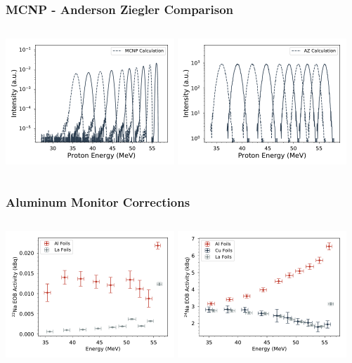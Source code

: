 \documentclass[12pt,xcolor=dvipsnames]{beamer}
\begin{document}
\begin{frame}
\frametitle{MCNP - Anderson Ziegler Comparison}
\begin{columns}[c]
\column{2.5in}
\includegraphics[width=2.5in]{monitors/La_mcnp_spectrum}
\column{2.5in}
\includegraphics[width=2.5in]{monitors/La_az_spectrum}
\end{columns}
\end{frame}

\begin{frame}
\frametitle{Aluminum Monitor Corrections}
\begin{columns}[c]
\column{2.5in}
\includegraphics[width=2.5in]{monitors/22NA_Al_Correction}
\column{2.5in}
\includegraphics[width=2.5in]{monitors/24NA_Al_Correction}
\end{columns}
\end{frame}
\end{document}
